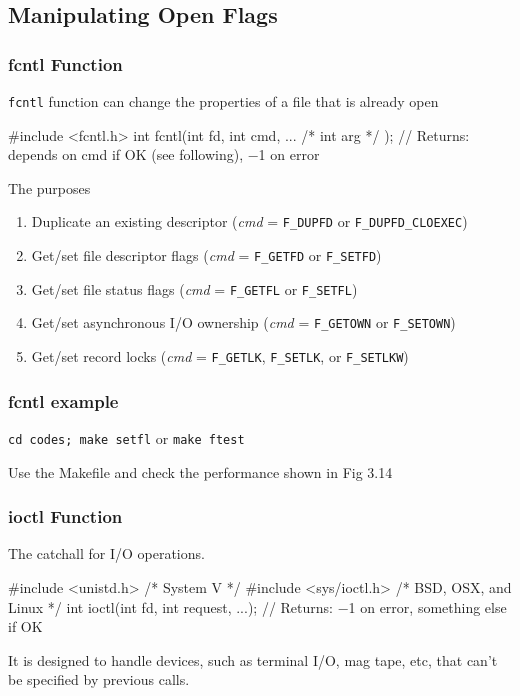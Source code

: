 \documentclass[newPxFont,sthlmFooter,nooffset]{beamer}
\begin{document}
\subsection{Manipulating Open Flags}
\begin{frame}[containsverbatim,t]
  \frametitle{fcntl Function}
\texttt{fcntl} function can change the properties of a file that is already open

\begin{codedef}
#include <fcntl.h>
int fcntl(int fd, int cmd, ... /* int arg */ );
// Returns: depends on cmd if OK (see following), −1 on error
\end{codedef}

The purposes
\begin{enumerate}
\item  Duplicate an existing descriptor (\textit{cmd} = \texttt{F\_DUPFD} or \texttt{F\_DUPFD\_CLOEXEC})
\item Get/set file descriptor flags (\textit{cmd} = \texttt{F\_GETFD} or \texttt{F\_SETFD})
\item Get/set file status flags (\textit{cmd} = \texttt{F\_GETFL} or \texttt{F\_SETFL})
\item Get/set asynchronous I/O ownership (\textit{cmd} = \texttt{F\_GETOWN} or \texttt{F\_SETOWN})
\item Get/set record locks (\textit{cmd} = \texttt{F\_GETLK}, \texttt{F\_SETLK}, or \texttt{F\_SETLKW})
\end{enumerate}
\end{frame}

\begin{frame}[containsverbatim,t]
  \frametitle{fcntl example}

\texttt{cd codes; make setfl} or \texttt{make ftest}


Use the Makefile and check the performance shown in Fig 3.14


\end{frame}


\begin{frame}[containsverbatim,t]
  \frametitle{ioctl Function}
The catchall for I/O operations.

\begin{codedef}
#include <unistd.h>     /* System V */
#include <sys/ioctl.h>  /* BSD, OSX, and Linux */
int ioctl(int fd, int request, ...);
// Returns: −1 on error, something else if OK
\end{codedef}
\bigskip

It is designed to handle devices, such as terminal I/O, mag tape, etc, that can't be specified by previous calls.
\end{frame}
\end{document}
